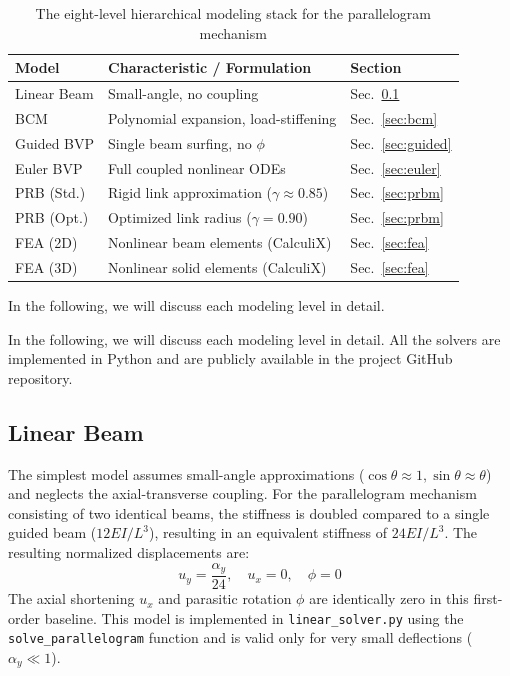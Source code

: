 \documentclass[colorlinks,upint,subscriptcorrection,varvw,hyphenate,balance]{asmeconf} %
\begin{document}
\begin{table}[ht]
\centering
\caption{The eight-level hierarchical modeling stack for the parallelogram mechanism}
\label{tab:modeling_stack}
\begin{tabular}{lll}
\toprule
\textbf{Model} & \textbf{Characteristic / Formulation} & \textbf{Section} \\
\midrule
Linear Beam & Small-angle, no coupling & Sec.~\ref{sec:linear} \\
BCM \cite{awtar2007characteristics} & Polynomial expansion, load-stiffening & Sec.~\ref{sec:bcm} \\
Guided BVP & Single beam surfing, no $\phi$ & Sec.~\ref{sec:guided} \\
Euler BVP & Full coupled nonlinear ODEs & Sec.~\ref{sec:euler} \\
PRB (Std.) & Rigid link approximation ($\gamma \approx 0.85$) & Sec.~\ref{sec:prbm} \\
PRB (Opt.) & Optimized link radius ($\gamma = 0.90$) & Sec.~\ref{sec:prbm} \\
FEA (2D) & Nonlinear beam elements (CalculiX) & Sec.~\ref{sec:fea} \\
FEA (3D) & Nonlinear solid elements (CalculiX) & Sec.~\ref{sec:fea} \\
\bottomrule
\end{tabular}
\end{table}

In the following, we will discuss each modeling level in detail.

In the following, we will discuss each modeling level in detail. All the solvers are implemented in Python and are publicly available in the project GitHub repository.%

\subsection{Linear Beam}
\label{sec:linear}
The simplest model assumes small-angle approximations ($\cos\theta \approx 1, \sin\theta \approx \theta$) and neglects the axial-transverse coupling. For the parallelogram mechanism consisting of two identical beams, the stiffness is doubled compared to a single guided beam ($12EI/L^3$), resulting in an equivalent stiffness of $24EI/L^3$. The resulting normalized displacements are:
\begin{equation}
u_y = \frac{\alpha_y}{24}, \quad u_x = 0, \quad \phi = 0 
\end{equation}
The axial shortening $u_x$ and parasitic rotation $\phi$ are identically zero in this first-order baseline. This model is implemented in \texttt{linear\_solver.py} using the \texttt{solve\_parallelogram} function and is valid only for very small deflections ($\alpha_y \ll 1$).
\end{document}
